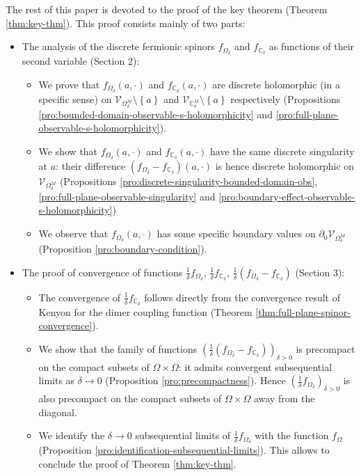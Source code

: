 \documentclass[oneside,english]{amsart}
\numberwithin{equation}{section}
\numberwithin{figure}{section}
\theoremstyle{plain}
\theoremstyle{plain}
\theoremstyle{plain}
\theoremstyle{plain}
\theoremstyle{plain}
\theoremstyle{definition}
\theoremstyle{remark}
\begin{document}
The rest of this paper is devoted to the proof of the key theorem
(Theorem \ref{thm:key-thm}). This proof consists mainly of two parts:
\begin{itemize}
\item The analysis of the discrete fermionic spinors $f_{\Omega_{\delta}}$
and $f_{\mathbb{C}_{\delta}}$ as functions of their second variable
(Section 2):

\begin{itemize}
\item We prove that $f_{\Omega_{\delta}}\left(a,\cdot\right)$ and $f_{\mathbb{C}_{\delta}}\left(a,\cdot\right)$
are discrete holomorphic (in a specific sense) on $\mathcal{V}_{\Omega_{\delta}^{M}}\setminus\left\{ a\right\} $
and $\mathcal{V}_{\mathbb{C}_{\delta}^{M}}\setminus\left\{ a\right\} $
respectively (Propositions \ref{pro:bounded-domain-observable-s-holomorphicity}
and \ref{pro:full-plane-observable-s-holomorphicity}).
\item We show that $f_{\Omega_{\delta}}\left(a,\cdot\right)$ and $f_{\mathbb{C}_{\delta}}\left(a,\cdot\right)$
have the same discrete singularity at $a$: their difference $\left(f_{\Omega_{\delta}}-f_{\mathbb{C}_{\delta}}\right)\left(a,\cdot\right)$
is hence discrete holomorphic on $\mathcal{V}_{\Omega_{\delta}^{M}}$
(Propositions \ref{pro:discrete-singularity-bounded-domain-obs},
\ref{pro:full-plane-observable-singularity} and \ref{pro:boundary-effect-observable-s-holomorphicity})
\item We observe that $f_{\Omega_{\delta}}\left(a,\cdot\right)$ has some
specific boundary values on $\partial_{0}\mathcal{V}_{\Omega_{\delta}^{M}}$
(Proposition \ref{pro:boundary-condition}).
\end{itemize}
\item The proof of convergence of functions $\frac{1}{\delta}f_{\Omega_{\delta}}$,
$\frac{1}{\delta}f_{\mathbb{C}_{\delta}}$, $\frac{1}{\delta}\left(f_{\Omega_{\delta}}-f_{\mathbb{C}_{\delta}}\right)$
(Section 3):

\begin{itemize}
\item The convergence of $\frac{1}{\delta}f_{\mathbb{C}_{\delta}}$ follows
directly from the convergence result of Kenyon for the dimer coupling
function (Theorem \ref{thm:full-plane-spinor-convergence}).
\item We show that the family of functions $\left(\frac{1}{\delta}\left(f_{\Omega_{\delta}}-f_{\mathbb{C}_{\delta}}\right)\right)_{\delta>0}$
is precompact on the compact subsets of $\Omega\times\Omega$: it
admits convergent subsequential limits as $\delta\to0$ (Proposition
\ref{pro:precompactness}). Hence $\left(\frac{1}{\delta}f_{\Omega_{\delta}}\right)_{\delta>0}$
is also precompact on the compact subsets of $\Omega\times\Omega$
away from the diagonal.
\item We identify the $\delta\to0$ subsequential limits of $\frac{1}{\delta}f_{\Omega_{\delta}}$
with the function $f_{\Omega}$ (Proposition \ref{pro:identification-subsequential-limits}).
This allows to conclude the proof of Theorem \ref{thm:key-thm}.
\end{itemize}
\end{itemize}
\end{document}
